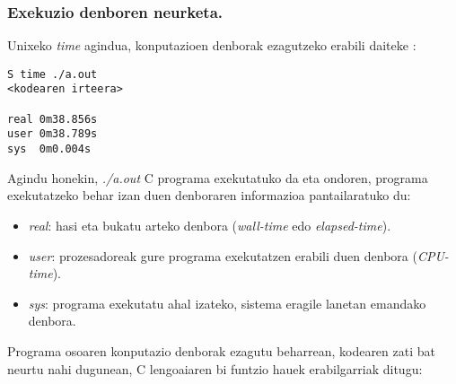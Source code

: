 \subsubsection*{Exekuzio denboren neurketa.}

Unixeko \emph{time} agindua, konputazioen denborak ezagutzeko erabili daiteke \cite{Pacheco2011}:

\begin{lstlisting} 
S time ./a.out
<kodearen irteera>

real 0m38.856s
user 0m38.789s
sys  0m0.004s
\end{lstlisting}

Agindu honekin, \emph{./a.out} C programa exekutatuko da eta ondoren, programa exekutatzeko behar izan duen denboraren informazioa pantailaratuko du:
\begin{itemize}
\item  \emph{real}: hasi eta bukatu arteko denbora (\emph{wall-time} edo \emph{elapsed-time}).
\item \emph{user}:  prozesadoreak gure programa exekutatzen erabili duen denbora (\emph{CPU-time}).
\item \emph{sys}:  programa exekutatu ahal izateko, sistema eragile lanetan emandako denbora. 
\end{itemize}

Programa osoaren konputazio denborak ezagutu beharrean, kodearen zati bat neurtu nahi dugunean, C lengoaiaren bi funtzio hauek erabilgarriak ditugu:

